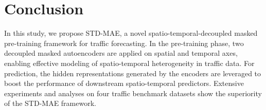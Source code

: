 \documentclass[letterpaper]{article} \usepackage{aaai24}  \usepackage{times}  \usepackage{helvet}  \usepackage{courier}  \usepackage[hyphens]{url}  \usepackage{graphicx} \urlstyle{rm} \def\UrlFont{\rm}  \usepackage{natbib}  \usepackage{caption} \frenchspacing  \setlength{\pdfpagewidth}{8.5in} \setlength{\pdfpageheight}{11in} \usepackage{algorithm}
\begin{document}
\section{Conclusion}\label{sec:conclusion}
In this study, we propose STD-MAE, a novel spatio-temporal-decoupled masked pre-training framework for traffic forecasting. In the pre-training phase, two decoupled masked autoencoders are applied on spatial and temporal axes, enabling effective modeling of spatio-temporal heterogeneity in traffic data. For prediction, the hidden representations generated by the encoders are leveraged to boost the performance of downstream spatio-temporal predictors. Extensive experiments and analyses on four traffic benchmark datasets show the superiority of the STD-MAE framework.





\clearpage
\end{document}
